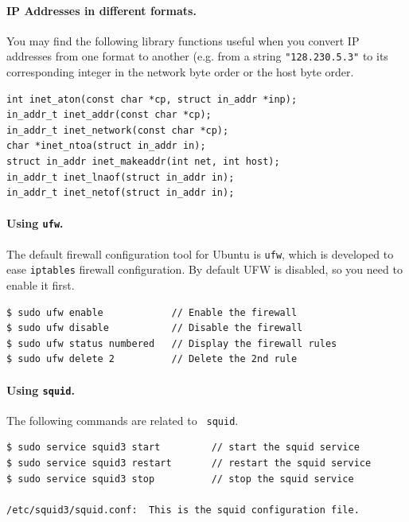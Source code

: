 \paragraph{IP Addresses in different formats.}
You may find the following library functions useful when you convert
IP addresses from one format to another (e.g. from a string {\tt "128.230.5.3"}
to its corresponding integer in the network byte order or the host byte order.
\begin{Verbatim}[frame=single]
int inet_aton(const char *cp, struct in_addr *inp);
in_addr_t inet_addr(const char *cp);
in_addr_t inet_network(const char *cp);
char *inet_ntoa(struct in_addr in);
struct in_addr inet_makeaddr(int net, int host);
in_addr_t inet_lnaof(struct in_addr in);
in_addr_t inet_netof(struct in_addr in);
\end{Verbatim}


\paragraph{Using {\tt ufw}.}
The default firewall configuration tool for Ubuntu is {\tt ufw}, 
which is developed to ease {\tt iptables} firewall configuration. 
By default UFW is disabled, so you need to enable it first.
\begin{Verbatim}[frame=single]
$ sudo ufw enable            // Enable the firewall
$ sudo ufw disable           // Disable the firewall
$ sudo ufw status numbered   // Display the firewall rules
$ sudo ufw delete 2          // Delete the 2nd rule
\end{Verbatim}

\paragraph{Using {\tt squid}.} The following commands are related to {\tt
squid}.
\begin{Verbatim}[frame=single]
$ sudo service squid3 start         // start the squid service
$ sudo service squid3 restart       // restart the squid service
$ sudo service squid3 stop          // stop the squid service

/etc/squid3/squid.conf:  This is the squid configuration file. 
\end{Verbatim}



